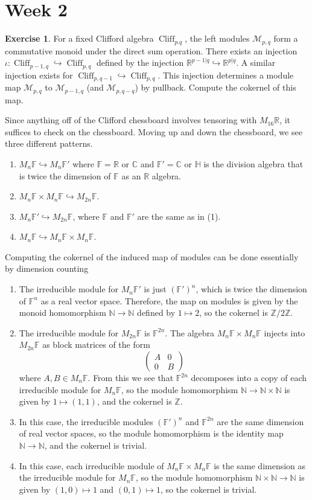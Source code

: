 \documentclass[psamsfonts]{amsart}
\theoremstyle{definition}
\newtheorem{exer}[thm]{Exercise}
\theoremstyle{remark}
\newcommand{\R}{\mathbb{R}}
\newcommand{\Z}{\mathbb{Z}}
\newcommand{\N}{\mathbb{N}}
\renewcommand{\H}{\mathbb{H}}
\newcommand{\C}{\mathbb{C}}
\newcommand{\F}{\mathbb{F}}
\DeclareMathOperator{\Cliff}{Cliff}
\begin{document}
\section*{Week 2}
%
\begin{exer}
For a fixed Clifford algebra $\Cliff_{p.q}$, the left modules $\mathcal{M}_{p,q}$ form a commutative monoid under the direct sum operation. There exists an injection $\iota : \Cliff_{p-1,q} \hookrightarrow \Cliff_{p,q}$ defined by the injection $\R^{p-1|q} \hookrightarrow \R^{p|q}$. A similar injection exists for $\Cliff_{p,q-1} \hookrightarrow \Cliff_{p,q}$. This injection determines a module map $\mathcal{M}_{p,q}$ to $\mathcal{M}_{p-1,q}$ (and $\mathcal{M}_{p,q-q}$) by pullback. Compute the cokernel of this map.
\end{exer}
%
Since anything off of the Clifford chessboard involves tensoring with $M_{16}\R$, it suffices to check on the chessboard. Moving up and down the chessboard, we see three different patterns.
\begin{enumerate}
\item $M_n\F \hookrightarrow M_n\F'$ where $\F = \R$ or $\C$ and $\F' = \C$ or $\H$ is the division algebra that is twice the dimension of $\F$ as an $\R$ algebra.
\item $M_n\F \times M_n\F \hookrightarrow M_{2n}\F$.
\item $M_{n}\F' \hookrightarrow M_{2n}\F$, where $\F$ and $\F'$ are the same as in (1).
\item $M_n\F \hookrightarrow M_n\F \times M_n\F$.
\end{enumerate}
%
Computing the cokernel of the induced map of modules can be done essentially by dimension counting
\begin{enumerate}
\item The irreducible module for $M_n\F'$ is just $(\F')^n$, which is twice the dimension of $\F^n$ as a real vector space. Therefore, the map on modules is given by the monoid homomorphism $\N \to \N$ defined by $1 \mapsto 2$, so the cokernel is $\Z / 2\Z$.
\item The irreducible module for $M_{2n}\F$ is $\F^{2n}$. The algebra $M_n\F \times M_n\F$ injects into $M_{2n}\F$ as block matrices of the form
\[
\begin{pmatrix}
A & 0 \\
0 & B
\end{pmatrix}
\]
where $A,B \in M_n\F$. From this we see that $\F^{2n}$ decomposes into a copy of each irreducible module for $M_n\F$, so the module homomorphism $\N \to \N\times\N$ is given by $1 \mapsto (1,1)$, and the cokernel is $\Z$.
\item In this case, the irreducible modules $(\F')^n$ and $\F^{2n}$ are the same dimension of real vector spaces, so the module homomorphism is the identity map $\N \to \N$, and the cokernel is trivial.
\item In this case, each irreducible module of $M_n\F \times M_n\F$ is the same dimension as the irreducible module for $M_n\F$, so the module homomorphism $\N \times \N \to \N$ is given by $(1,0) \mapsto 1$ and $(0,1) \mapsto 1$, so the cokernel is trivial.
\end{enumerate}
\end{document}
